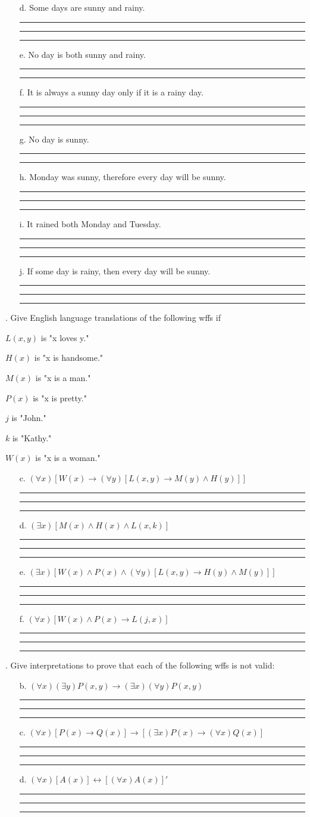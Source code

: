 \documentclass{article}
\newcommand{\answerline}{\newline\newline\noindent\rule{0.95\textwidth}{0.4pt}}
\begin{document}
\begin{itemize}
    \item[d.] Some days are sunny and rainy.
    \answerline
    \answerline
    \answerline
    \item[e.] No day is both sunny and rainy.
    \answerline
    \answerline
    \item[f.] It is always a sunny day only if it is a rainy day.
    \answerline
    \answerline
    \answerline
    \item[g.] No day is sunny.
    \answerline
    \answerline
    \item[h.] Monday was sunny, therefore every day will be sunny.
    \answerline
    \answerline
    \answerline
    \item[i.] It rained both Monday and Tuesday.
    \answerline
    \answerline
    \answerline
    \item[j.] If some day is rainy, then every day will be sunny.
    \answerline
    \answerline
    \answerline
\end{itemize}

. Give English language translations of the following wffs if

\( L(x, y) \) is "x loves y."

\( H(x) \) is "x is handsome."

\( M(x) \) is "x is a man."

\( P(x) \) is "x is pretty."

\( j \) is "John."

\( k \) is "Kathy."

\( W(x) \) is "x is a woman."

\begin{itemize}
    \item[c.] \( (\forall x)[W(x) \rightarrow (\forall y)[L(x,y) \rightarrow M(y) \land H(y)]] \)
    \answerline
    \answerline
    \answerline
    \item[d.] \( (\exists x)[M(x) \land H(x) \land L(x, k)] \)
    \answerline
    \answerline
    \answerline
    \item[e.] \( (\exists x)[W(x) \land P(x) \land (\forall y)[L(x, y) \rightarrow H(y) \land M(y)]] \)
    \answerline
    \answerline
    \answerline
    \item[f.] \( (\forall x)[W(x) \land P(x) \rightarrow L(j, x)] \)
    \answerline
    \answerline
    \answerline
\end{itemize}

\newpage
{}. Give interpretations to prove that each of the following wffs is not valid:
\begin{itemize}
    \item[b.] \( (\forall x)(\exists y)P(x, y) \rightarrow (\exists x)(\forall y)P(x, y) \)
    \answerline
    \answerline
    \answerline
    \item[c.] \( (\forall x)[P(x) \rightarrow Q(x)] \rightarrow [(\exists x)P(x) \rightarrow (\forall x)Q(x)] \)
    \answerline
    \answerline
    \answerline
    \item[d.] \( (\forall x)[A(x)] \leftrightarrow [(\forall x)A(x)]' \)
    \answerline
    \answerline
    \answerline
\end{itemize}
\end{document}
